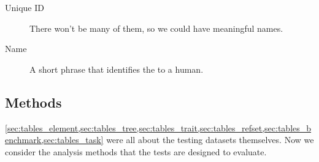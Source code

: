 \begin{description}
    \item[Unique ID] There won't be many of them, so we could have meaningful names.
    \item[Name] A short phrase that identifies the \Task to a human.
\end{description}

\subsection{Methods}
\label{sec:tables_method}

\cref{sec:tables_element,sec:tables_tree,sec:tables_trait,sec:tables_refset,sec:tables_benchmark,sec:tables_task} were all about the testing datasets themselves.
Now we consider the analysis methods that the tests are designed to evaluate.

